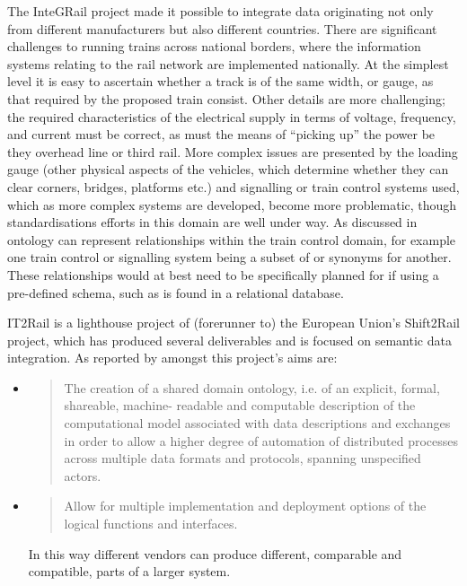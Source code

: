 The InteGRail project made it possible to integrate data originating not only from different manufacturers but also different countries. There are significant challenges to running trains across national borders, where the information systems relating to the rail network are implemented nationally. At the simplest level it is easy to ascertain whether a track is of the same width, or gauge, as that required by the proposed train consist. Other details are more challenging; the required characteristics of the electrical supply in terms of voltage, frequency, and current must be correct, as must the means of ``picking up'' the power be they overhead line or third rail. More complex issues are presented by the loading gauge (other physical aspects of the vehicles, which determine whether they can clear corners, bridges, platforms etc.) and signalling or train control systems used, which as more complex systems are developed, become more problematic, though standardisations efforts in this domain are well under way. As discussed in \citet{Verstichel2011} ontology can represent relationships within the train control domain, for example one train control or signalling system being a subset of or synonyms for another. These relationships would at best need to be specifically planned for if using a pre-defined schema, such as is found in a relational database.

IT2Rail is a lighthouse project of (\ie forerunner to) the European Union's Shift2Rail project, which has produced several deliverables and is focused on semantic data integration. As reported by \citet{Gogos2016} amongst this project's aims are:
\begin{itemize}
    \item 
    \begin{quote}
    The creation of a shared domain ontology, i.e. of an explicit, formal, shareable, machine-
readable and computable description of the computational model associated with data
descriptions and exchanges in order to allow a higher degree of automation of distributed
processes across multiple data formats and protocols, spanning unspecified actors.
    \end{quote}
    \item 
    \begin{quote}
    Allow for multiple implementation and deployment options of the logical functions and
interfaces.
    \end{quote}
 In this way different vendors can produce different, comparable and compatible, parts of a larger system.
\end{itemize}

